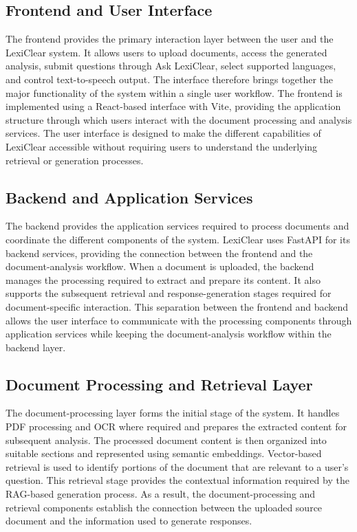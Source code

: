 \documentclass[12pt,a4paper,oneside]{report}
\begin{document}
\subsection{Frontend and User Interface}

The frontend provides the primary interaction layer between the user and the
LexiClear system. It allows users to upload documents, access the generated
analysis, submit questions through Ask LexiClear, select supported languages,
and control text-to-speech output. The interface therefore brings together
the major functionality of the system within a single user workflow. The
frontend is implemented using a React-based interface with Vite, providing
the application structure through which users interact with the document
processing and analysis services. The user interface is designed to make the
different capabilities of LexiClear accessible without requiring users to
understand the underlying retrieval or generation processes.

\subsection{Backend and Application Services}

The backend provides the application services required to process documents
and coordinate the different components of the system. LexiClear uses
FastAPI for its backend services, providing the connection between the
frontend and the document-analysis workflow. When a document is uploaded,
the backend manages the processing required to extract and prepare its
content. It also supports the subsequent retrieval and response-generation
stages required for document-specific interaction. This separation between
the frontend and backend allows the user interface to communicate with the
processing components through application services while keeping the
document-analysis workflow within the backend layer.

\subsection{Document Processing and Retrieval Layer}

The document-processing layer forms the initial stage of the system. It
handles PDF processing and OCR where required and prepares the extracted
content for subsequent analysis. The processed document content is then
organized into suitable sections and represented using semantic embeddings.
Vector-based retrieval is used to identify portions of the document that are
relevant to a user's question. This retrieval stage provides the contextual
information required by the RAG-based generation process. As a result, the
document-processing and retrieval components establish the connection between
the uploaded source document and the information used to generate responses.
\end{document}
